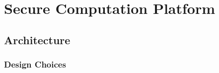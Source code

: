 
\chapter{Secure Computation Platform}
\label{ch:proposal}

\section{Architecture}

\subsection{Design Choices}

